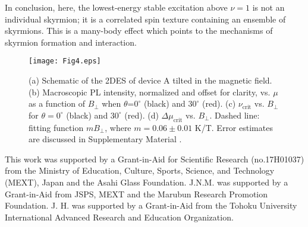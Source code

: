 \documentclass
[aps,prl,twocolumn,superscriptaddress,showpacs,floatfix]{revtex4-1}%
\begin{document}
In conclusion, here, the lowest-energy stable excitation above $\nu=1$ is not an individual skyrmion; it is a correlated spin texture containing an ensemble of skyrmions. This is a many-body effect which points to the mechanisms of skyrmion formation and interaction. 
\begin{figure}[t]
	\par
	\begin{center}
		\texttt{[image: Fig4.eps]}
	\end{center}
	\caption{(a) Schematic of the 2DES of device A tilted in the magnetic field. (b) Macroscopic PL intensity, normalized and offset for clarity, vs. $\mu$ as a function of $B_{\perp}$ when $\theta$=$0^\circ$ (black) and $30^\circ$ (red). (c) $\nu_{\text{crit}}$ vs. $B_{\perp}$ for $\theta=0^\circ$ (black) and $30^\circ$ (red). (d) $\Delta\mu_{\text{crit}}$ vs. $B_{\perp}$. Dashed line: fitting function $mB_{\perp}$, where $m=0.06\pm0.01$ K/T. Error estimates are discussed in Supplementary Material \cite{SI}.}%
\end{figure}

\begin{acknowledgments}
This work was supported by a Grant-in-Aid for Scientific Research (no.17H01037) from the Ministry of
Education, Culture, Sports, Science, and Technology (MEXT), Japan and the Asahi Glass Foundation. J.N.M. was
supported by a Grant-in-Aid from JSPS, MEXT and the Marubun Research Promotion
Foundation. J. H. was supported by a Grant-in-Aid from the Tohoku University
International Advanced Research and Education Organization.
\end{acknowledgments}
\end{document}
